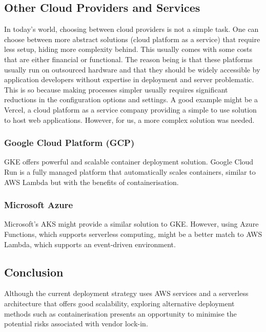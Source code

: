 \subsection{Other Cloud Providers and Services}
\label{subsec:other-cloud-providers}
In today's world, choosing between cloud providers is not a simple task.
One can choose between more abstract solutions (cloud platform as a service) that require less setup, hiding more complexity behind.
This usually comes with some costs that are either financial or functional.
The reason being is that these platforms usually run on outsourced hardware and that they should be widely accessible by application developers without expertise in deployment and server problematic. 
This is so because making processes simpler usually requires significant reductions in the configuration options and settings. 
A good example might be a Vercel, a cloud platform as a service company providing a simple to use solution to host web applications.
However, for us, a more complex solution was needed. 

\subsubsection{Google Cloud Platform (GCP)}
\ac{GKE} offers powerful and scalable container deployment solution.
Google Cloud Run is a fully managed platform that automatically scales containers, similar to AWS Lambda but with the benefits of containerisation. 

\subsubsection{Microsoft Azure}
Microsoft's \ac{AKS} might provide a similar solution to \ac{GKE}. However, using Azure Functions, which supports serverless computing, might be a better match to \ac{AWS} Lambda, which supports an event-driven environment.

\subsection{Conclusion}
Although the current deployment strategy uses \ac{AWS} services and a serverless architecture that offers good scalability, exploring alternative deployment methods such as containerisation presents an opportunity to minimise the potential risks associated with vendor lock-in.

